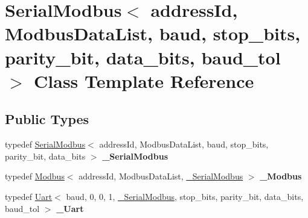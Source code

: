 \hypertarget{classSerialModbus}{}\section{Serial\+Modbus$<$ address\+Id, Modbus\+Data\+List, baud, stop\+\_\+bits, parity\+\_\+bit, data\+\_\+bits, baud\+\_\+tol $>$ Class Template Reference}
\label{classSerialModbus}
\subsection*{Public Types}
\begin{DoxyCompactItemize}
\item 
typedef \hyperlink{classSerialModbus}{Serial\+Modbus}$<$ address\+Id, Modbus\+Data\+List, baud, stop\+\_\+bits, parity\+\_\+bit, data\+\_\+bits $>$ {\bfseries \+\_\+\+Serial\+Modbus}\hypertarget{classSerialModbus_a5bcd2b6c412dc9490c20fb74ed6f1c6f}{}\label{classSerialModbus_a5bcd2b6c412dc9490c20fb74ed6f1c6f}

\item 
typedef \hyperlink{classModbus}{Modbus}$<$ address\+Id, Modbus\+Data\+List, \hyperlink{classSerialModbus}{\+\_\+\+Serial\+Modbus} $>$ {\bfseries \+\_\+\+Modbus}\hypertarget{classSerialModbus_a510d3c49df1125fd0de1d8a4b29418a9}{}\label{classSerialModbus_a510d3c49df1125fd0de1d8a4b29418a9}

\item 
typedef \hyperlink{classUart}{Uart}$<$ baud, 0, 0, 1, \hyperlink{classSerialModbus}{\+\_\+\+Serial\+Modbus}, stop\+\_\+bits, parity\+\_\+bit, data\+\_\+bits, baud\+\_\+tol $>$ {\bfseries \+\_\+\+Uart}\hypertarget{classSerialModbus_a1545c72d8a0138c4c4807427994037b6}{}\label{classSerialModbus_a1545c72d8a0138c4c4807427994037b6}

\end{DoxyCompactItemize}
